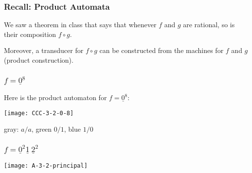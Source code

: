 \documentclass[handout,10pt]{ksbeamer}
\def\F#1{\underline{#1}}
\begin{document}
\begin{frame}
\frametitle{Recall: Product Automata}

We saw a theorem in class that says that whenever $f$ and $g$ are rational,
so is their composition $f \circ g$.
\vspace{5ex}

Moreover, a transducer for $f \circ g$ can be constructed from the machines
for $f$ and $g$  (product construction). 

\end{frame}

\begin{frame}
\frametitle{$f = \F{0}^{8}$}

Here is the product automaton for $f = \F{0}^{8}$:
\vspace{3ex} 

\begin{center}
\texttt{[image: CCC-3-2-0-8]}
\end{center}
\vspace{3ex} 

gray:  $a/a$, green  $0/1$, blue $1/0$


\end{frame}

\begin{frame}
\frametitle{$f = \F{0}^{2}\F{1}\:\F{2}^{2}$}

\begin{center}
\texttt{[image: A-3-2-principal]}
\end{center}

\end{frame}
\end{document}
